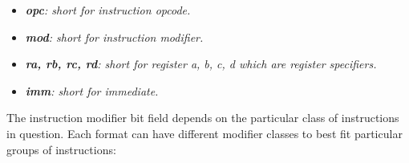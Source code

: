             \vspace{10pt}
            
            \vspace{10pt}

            \begin{itemize}

                \item \textit{\textbf{opc}: short for instruction opcode.}
                \item \textit{\textbf{mod}: short for instruction modifier.}
                \item \textit{\textbf{ra, rb, rc, rd}: short for register a, b, c, d which are register specifiers.}
                \item \textit{\textbf{imm}: short for immediate.}

            \end{itemize}

            The instruction modifier bit field depends on the particular class of instructions in question. Each format can have different modifier classes to best fit particular groups of instructions:

